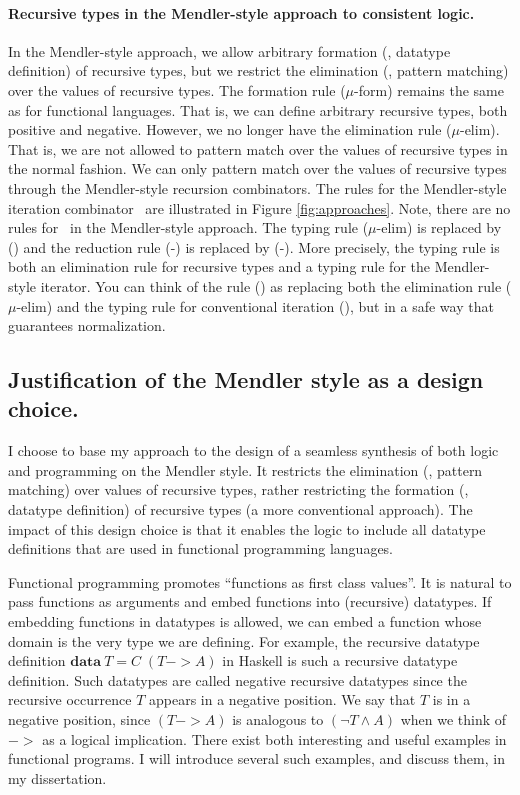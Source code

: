 \paragraph{Recursive types in the Mendler-style approach to consistent logic.}
In the Mendler-style approach, we allow arbitrary formation
(\ie, datatype definition) of recursive types, but we restrict
the elimination (\ie, pattern matching) over the values of recursive types. 
The formation rule {\small($\mu$-form)} remains the same as
for functional languages. That is, we can define arbitrary recursive types,
both positive and negative. However, we no longer have the elimination
rule {\small($\mu$-elim)}. That is, we are not allowed to pattern match over
the values of recursive types in the normal fashion. We can only pattern match
over the values of recursive types through the Mendler-style recursion
combinators. The rules for the Mendler-style iteration combinator \MIt\
are illustrated in Figure \ref{fig:approaches}.
Note, there are no rules for \unIn\ in the Mendler-style approach.
The typing rule {\small($\mu$-elim)} is replaced by {\small(\MIt)} and
the reduction rule {\small(\unIn-\In)} is replaced by {\small(\MIt-\In)}.
More precisely, the typing rule {\small \MIt} is both an elimination rule
for recursive types and a typing rule for the Mendler-style iterator.
You can think of the rule {\small(\MIt)} as replacing both the elimination rule
{\small($\mu$-elim)} and the typing rule for conventional iteration
{\small(\It)}, but in a safe way that guarantees normalization.

\subsection{Justification of the Mendler style as a design choice.}
I choose to base my approach to the design of a seamless synthesis of both
logic and programming on the Mendler style. It restricts the elimination (\ie,
pattern matching) over values of recursive types, rather restricting the
formation (\ie, datatype definition) of recursive types (a more conventional
approach). The impact of this design choice is that it enables the logic to
include all datatype definitions that are used in functional programming
languages.

Functional programming promotes ``functions as first class values''.
It is natural to pass functions as arguments and embed functions into
(recursive) datatypes. If embedding functions in datatypes is allowed,
we can embed a function whose domain is the very type we are defining.
For example, the recursive datatype definition
$\mathbf{data}~T = C\;(T -> \textit{A})$ in Haskell is such a recursive
datatype definition. Such datatypes are called negative recursive datatypes
since the recursive occurrence $T$ appears in a negative position.
We say that $T$ is in a negative position, since $(T -> A)$ is analogous to
$(\neg T \land A)$ when we think of $->$ as a logical implication. There exist
both interesting and useful examples in functional programs. I will
introduce several such examples, and discuss them, in my dissertation.

